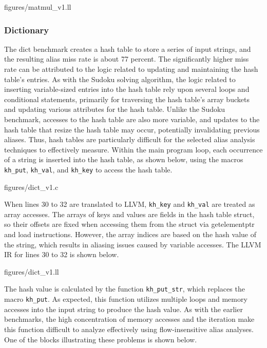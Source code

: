  {figures/matmul\_v1.ll}

\subsubsection{Dictionary}
The dict benchmark creates a hash table to store a series of input strings, and the resulting alias miss rate is about 77 percent. The significantly higher miss rate can be attributed to the logic related to updating and maintaining the hash table's entries. As with the Sudoku solving algorithm, the logic related to inserting variable-sized entries into the hash table rely upon several loops and conditional statements, primarily for traversing the hash table's array buckets and updating various attributes for the hash table. Unlike the Sudoku benchmark, accesses to the hash table are also more variable, and updates to the hash table that resize the hash table may occur, potentially invalidating previous aliases. Thus, hash tables are particularly difficult for the selected alias analysis techniques to effectively measure. Within the main program loop, each occurrence of a string is inserted into the hash table, as shown below, using the macros \texttt{kh\_put}, \texttt{kh\_val}, and \texttt{kh\_key} to access the hash table.

 {figures/dict\_v1.c}

When lines 30 to 32 are translated to LLVM, \texttt{kh\_key} and \texttt{kh\_val} are treated as array accesses. The arrays of keys and values are fields in the hash table struct, so their offsets are fixed when accessing them from the struct via getelementptr and load instructions. However, the array indices are based on the hash value of the string, which results in aliasing issues caused by variable accesses. The LLVM IR for lines 30 to 32 is shown below.

 {figures/dict\_v1.ll}

The hash value is calculated by the function \texttt{kh\_put\_str}, which replaces the macro \texttt{kh\_put}. As expected, this function utilizes multiple loops and memory accesses into the input string to produce the hash value. As with the earlier benchmarks, the high concentration of memory accesses and the iteration make this function difficult to analyze effectively using flow-insensitive alias analyses. One of the blocks illustrating these problems is shown below.

